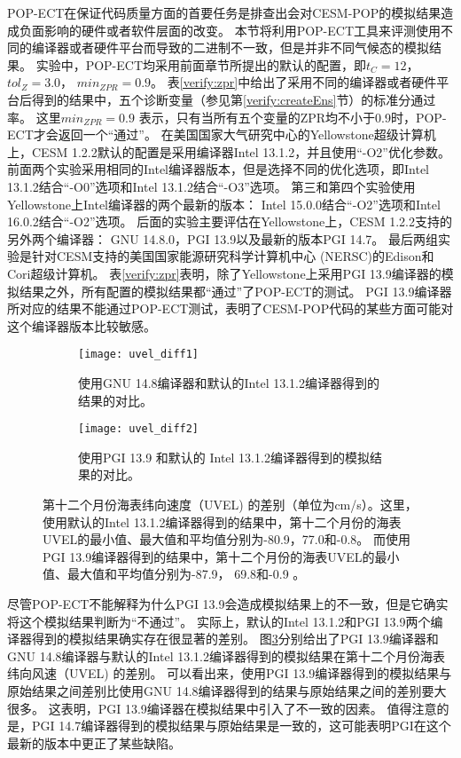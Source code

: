   
POP-ECT在保证代码质量方面的首要任务是排查出会对CESM-POP的模拟结果造成负面影响的硬件或者软件层面的改变。
本节将利用POP-ECT工具来评测使用不同的编译器或者硬件平台而导致的二进制不一致，但是并非不同气候态的模拟结果。
实验中，POP-ECT均采用前面章节所提出的默认的配置，即$t_C= 12$， $tol_{Z} =3.0$， $min_{ZPR} =0.9$。
表\ref{verify:zpr}中给出了采用不同的编译器或者硬件平台后得到的结果中，五个诊断变量（参见第\ref{verify:createEns}节）的标准分通过率。
这里$min_{ZPR} = 0.9$ 表示，只有当所有五个变量的ZPR均不小于0.9时，POP-ECT才会返回一个“通过”。 
在美国国家大气研究中心的Yellowstone超级计算机上，CESM 1.2.2默认的配置是采用编译器Intel 13.1.2，并且使用“-O2”优化参数。
前面两个实验采用相同的Intel编译器版本，但是选择不同的优化选项，即Intel 13.1.2结合“-O0”选项和Intel 13.1.2结合“-O3”选项。
第三和第四个实验使用Yellowstone上Intel编译器的两个最新的版本： Intel 15.0.0结合“-O2”选项和Intel 16.0.2结合“-O2”选项。
后面的实验主要评估在Yellowstone上，CESM 1.2.2支持的另外两个编译器： GNU 14.8.0，PGI 13.9以及最新的版本PGI 14.7。 
最后两组实验是针对CESM支持的美国国家能源研究科学计算机中心 (NERSC)的Edison和Cori超级计算机。 
表\ref{verify:zpr}表明，除了Yellowstone上采用PGI 13.9编译器的模拟结果之外，所有配置的模拟结果都“通过”了POP-ECT的测试。
PGI 13.9编译器所对应的结果不能通过POP-ECT测试，表明了CESM-POP代码的某些方面可能对这个编译器版本比较敏感。

\begin{figure}[!ht]
\begin{subfigure}[t]{1\textwidth}
\centering
\texttt{[image: uvel\_diff1]}
\caption{使用GNU 14.8编译器和默认的Intel 13.1.2编译器得到的结果的对比。\label{fig:uvel1}}
\vspace{10pt}
\end{subfigure}
\begin{subfigure}[t]{1\textwidth}
\centering
\texttt{[image: uvel\_diff2]}
\caption{使用PGI 13.9 和默认的 Intel 13.1.2编译器得到的模拟结果的对比。\label{fig:uvel2} }
\vspace{3pt}
\end{subfigure}
\caption{第十二个月份海表纬向速度（UVEL) 的差别（单位为cm/s）。这里，使用默认的Intel 13.1.2编译器得到的结果中，第十二个月份的海表UVEL的最小值、最大值和平均值分别为-80.9，77.0和-0.8。 而使用PGI 13.9编译器得到的结果中，第十二个月份的海表UVEL的最小值、最大值和平均值分别为-87.9， 69.8和-0.9 。\label{fig:uvel}}
\end {figure}
尽管POP-ECT不能解释为什么PGI 13.9会造成模拟结果上的不一致，但是它确实将这个模拟结果判断为“不通过”。
实际上，默认的Intel 13.1.2和PGI 13.9两个编译器得到的模拟结果确实存在很显著的差别。
图\ref{fig:uvel}分别给出了PGI 13.9编译器和GNU 14.8编译器与默认的Intel 13.1.2编译器得到的模拟结果在第十二个月份海表纬向风速（UVEL) 的差别。
可以看出来，使用PGI 13.9编译器得到的模拟结果与原始结果之间差别比使用GNU 14.8编译器得到的结果与原始结果之间的差别要大很多。
这表明，PGI 13.9编译器在模拟结果中引入了不一致的因素。
值得注意的是，PGI 14.7编译器得到的模拟结果与原始结果是一致的，这可能表明PGI在这个最新的版本中更正了某些缺陷。
 

